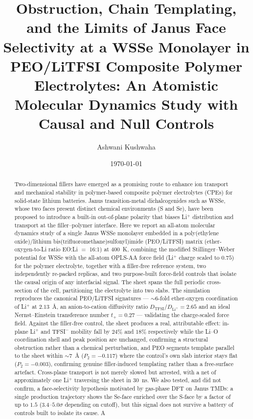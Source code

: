 \documentclass[review, 12pt]{elsarticle}
\numberwithin{equation}{section}
\newcommand{\DLi}{D_{\mathrm{Li}^+}}
\newcommand{\WSSe}{WSSe\xspace}
\newcommand{\LiTFSI}{LiTFSI\xspace}
\begin{document}
\begin{frontmatter}

\title{Obstruction, Chain Templating, and the Limits of Janus Face Selectivity at a WSSe Monolayer in PEO/LiTFSI Composite Polymer Electrolytes: An Atomistic Molecular Dynamics Study with Causal and Null Controls}

\author[]{Ashwani Kushwaha}
\address{Department of Mechanical Engineering, Indian Institute of Technology Bombay, Mumbai 400076, India}

\date{\today}

\begin{abstract}
\noindent
Two-dimensional fillers have emerged as a promising route to enhance ion transport and mechanical stability in polymer-based composite polymer electrolytes (CPEs) for solid-state lithium batteries. Janus transition-metal dichalcogenides such as \WSSe, whose two faces present distinct chemical environments (S and Se), have been proposed to introduce a built-in out-of-plane polarity that biases Li$^+$ distribution and transport at the filler--polymer interface. Here we report an all-atom molecular dynamics study of a single Janus \WSSe monolayer embedded in a poly(ethylene oxide)/lithium bis(trifluoromethane)sulfonyl)imide (PEO/\LiTFSI) matrix (ether-oxygen-to-Li ratio EO:Li $=$ 16:1) at $400$~K, combining the modified Stillinger--Weber potential for \WSSe with the all-atom OPLS-AA force field (Li$^+$ charge scaled to $0.75$) for the polymer electrolyte, together with a filler-free reference system, two independently re-packed replicas, and two purpose-built force-field controls that isolate the causal origin of any interfacial signal. The sheet spans the full periodic cross-section of the cell, partitioning the electrolyte into two slabs. The simulation reproduces the canonical PEO/\LiTFSI signatures --- $\sim6$-fold ether-oxygen coordination of Li$^+$ at $2.13$~\AA, an anion-to-cation diffusivity ratio $D_{\mathrm{TFSI}}/\DLi = 2.65$ and an ideal Nernst--Einstein transference number $t_+ = 0.27$ --- validating the charge-scaled force field. Against the filler-free control, the sheet produces a real, attributable effect: in-plane Li$^+$ and TFSI$^-$ mobility fall by $24\%$ and $18\%$ respectively while the Li--O coordination shell and peak position are unchanged, confirming a structural obstruction rather than a chemical perturbation, and PEO segments template parallel to the sheet within $\sim7$~\AA{} ($P_2=-0.117$) where the control's own slab interior stays flat ($P_2=-0.003$), confirming genuine filler-induced templating rather than a free-surface artefact. Cross-plane transport is not merely slowed but arrested, with a net of approximately one Li$^+$ traversing the sheet in $30$~ns. We also tested, and did not confirm, a face-selectivity hypothesis motivated by gas-phase DFT on Janus TMDs: a single production trajectory shows the Se-face enriched over the S-face by a factor of up to $1.5$ ($3.4$--$5.0\sigma$ depending on cutoff), but this signal does not survive a battery of controls built to isolate its cause. A 
\end{abstract}
\end{frontmatter}
\end{document}
